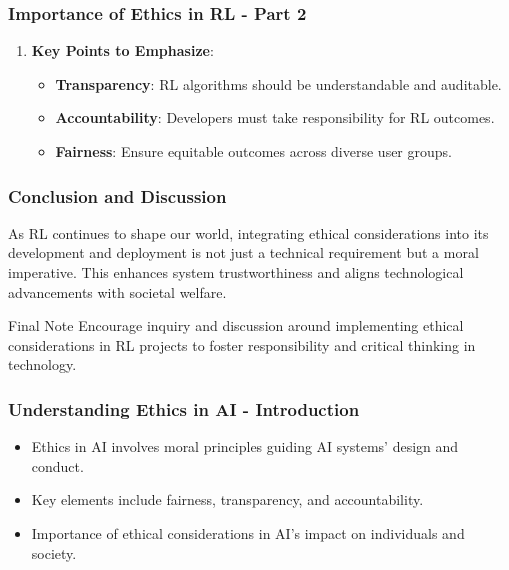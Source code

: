 \documentclass{beamer}
\begin{document}
\begin{frame}[fragile]
    \frametitle{Importance of Ethics in RL - Part 2}
    \begin{enumerate}
        \begin{itemize}
            \item **Real-World Examples**:
            \begin{itemize}
                \item \textbf{Healthcare}: RL optimizes treatment plans but raises concerns about patient privacy and consent.
                \item \textbf{Finance}: Automated trading using RL can destabilize markets if ethical considerations are ignored.
            \end{itemize}
        \end{itemize}

        \item \textbf{Key Points to Emphasize}:
        \begin{itemize}
            \item \textbf{Transparency}: RL algorithms should be understandable and auditable.
            \item \textbf{Accountability}: Developers must take responsibility for RL outcomes.
            \item \textbf{Fairness}: Ensure equitable outcomes across diverse user groups.
        \end{itemize}
    \end{enumerate}
\end{frame}

\begin{frame}[fragile]
    \frametitle{Conclusion and Discussion}
    As RL continues to shape our world, integrating ethical considerations into its development and deployment is not just a technical requirement but a moral imperative. This enhances system trustworthiness and aligns technological advancements with societal welfare.

    \begin{block}{Final Note}
        Encourage inquiry and discussion around implementing ethical considerations in RL projects to foster responsibility and critical thinking in technology.
    \end{block}
\end{frame}

\begin{frame}[fragile]
    \frametitle{Understanding Ethics in AI - Introduction}
    \begin{itemize}
        \item Ethics in AI involves moral principles guiding AI systems' design and conduct.
        \item Key elements include fairness, transparency, and accountability.
        \item Importance of ethical considerations in AI's impact on individuals and society.
    \end{itemize}
\end{frame}
\end{document}
